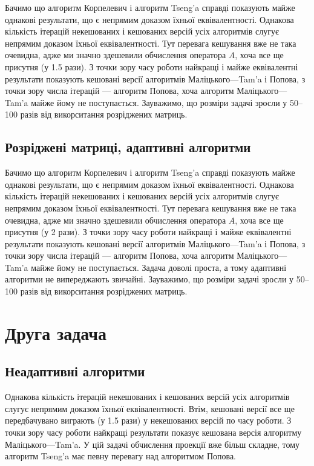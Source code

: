

Бачимо що алгоритм Корпелевич і алгоритм Tseng'a справді показують майже однакові результати, що є непрямим доказом їхньої еквівалентності. Однакова кількість ітерацій некешованих і кешованих версій усіх алгоритмів слугує непрямим доказом їхньої еквівалентності. Тут перевага кешування вже не така очевидна, адже ми значно здешевили обчислення оператора $A$, хоча все ще присутня (у 1.5 рази). З точки зору часу роботи найкращі і майже еквівалентні результати показують кешовані версії алгоритмів Маліцького---Tam'a і Попова, з точки зору числа ітерацій --- алгоритм Попова, хоча алгоритм Маліцького---Tam'a майже йому не поступається. Зауважимо, що розміри задачі зросли у 50--100 разів від викорситання розріджених матриць.

\newpage\subsection{Розріджені матриці, адаптивні алгоритми}



Бачимо що алгоритм Корпелевич і алгоритм Tseng'a справді показують майже однакові результати, що є непрямим доказом їхньої еквівалентності. Однакова кількість ітерацій некешованих і кешованих версій усіх алгоритмів слугує непрямим доказом їхньої еквівалентності. Тут перевага кешування вже не така очевидна, адже ми значно здешевили обчислення оператора $A$, хоча все ще присутня (у 2 рази). З точки зору часу роботи найкращі і майже еквівалентні результати показують кешовані версії алгоритмів Маліцького---Tam'a і Попова, з точки зору числа ітерацій --- алгоритм Попова, хоча алгоритм Маліцького---Tam'a майже йому не поступається. Задача доволі проста, а тому адаптивні алгоритми не випереджають звичайні. Зауважимо, що розміри задачі зросли у 50--100 разів від викорситання розріджених матриць.

\section{Друга задача}

\subsection{Неадаптивні алгоритми}



Однакова кількість ітерацій некешованих і кешованих версій усіх алгоритмів слугує непрямим доказом їхньої еквівалентності. Втім, кешовані версії все ще передбачувано виграють (у 1.5 рази) у некешованих версій по часу роботи. З точки зору часу роботи найкращі результати показує кешована версія алгоритму Маліцького---Tam'a. У цій задачі обчислення проекції вже більш складне, %
тому алгоритм Tseng'a має певну перевагу над алгоритмом Попова. 

